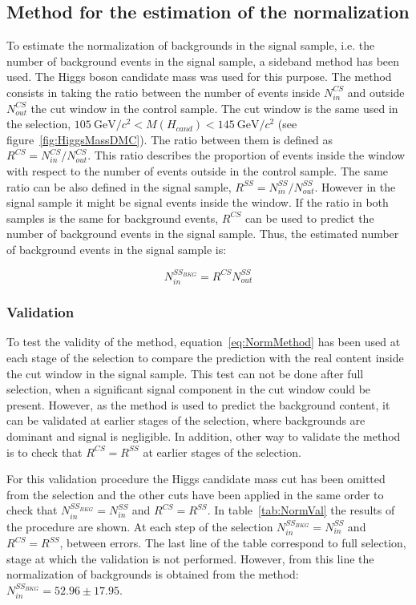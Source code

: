 \subsection{Method for the estimation of the normalization}
\label{sec:bkgnormmet}

To estimate the normalization of backgrounds in the signal sample, i.e. the number of background events in the signal sample, a sideband method has been used. The Higgs boson candidate mass was used for this purpose. The method consists in taking the ratio between the number of events inside $N^{CS}_{in}$ and outside $N^{CS}_{out}$ the cut window in the control sample. The cut window is the same used in the selection, $105~\text{GeV}/c^{2} <M(H_{cand})<145~\text{GeV}/c^{2}$ (see figure~\ref{fig:HiggsMassDMC}). The ratio between them is defined as $R^{CS}=N^{CS}_{in}/N^{CS}_{out}$. This ratio describes the proportion of events inside the window with respect to the number of events outside in the control sample. The same ratio can be also defined in the signal sample, $R^{SS}=N^{SS}_{in}/N^{SS}_{out}$. However in the signal sample it might be signal events inside the window. If the ratio in both samples is the same for background events, $R^{CS}$ can be used to predict the number of background events in the signal sample. Thus, the estimated number of background events in the signal sample is:

\begin{equation}
  \label{eq:NormMethod}
  N^{SS_{BKG}}_{in}=R^{CS}N^{SS}_{out}
\end{equation}

\subsubsection{Validation}
\label{sec:normval}

To test the validity of the method, equation~\ref{eq:NormMethod} has been used at each stage of the selection to compare the prediction with the real content inside the cut window in the signal sample. This test can not be done after full selection, when a significant signal component in the cut window could be present. However, as the method is used to predict the background content, it can be validated at earlier stages of the selection, where backgrounds are dominant and signal is negligible. In addition, other way to validate the method is to check that $R^{CS}=R^{SS}$ at earlier stages of the selection.

For this validation procedure the Higgs candidate mass cut has been omitted from the selection and the other cuts have been applied in the same order to check that $N^{SS_{BKG}}_{in}=N^{SS}_{in}$ and $R^{CS}=R^{SS}$. In table~\ref{tab:NormVal} the results of the procedure are shown. At each step of the selection $N^{SS_{BKG}}_{in}=N^{SS}_{in}$ and $R^{CS}=R^{SS}$, between errors. The last line of the table correspond to full selection, stage at which the validation is not performed. However, from this line the normalization of backgrounds is obtained from the method: $N^{SS_{BKG}}_{in}=52.96\pm17.95$.

